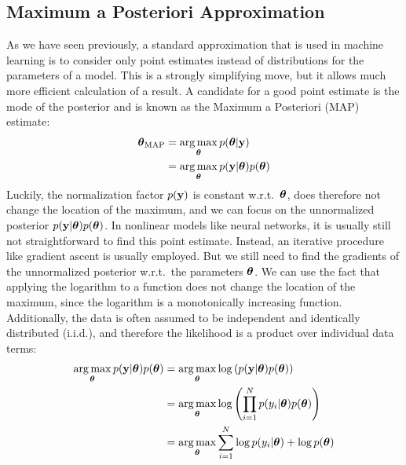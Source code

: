 \documentclass[../thesis.tex]{subfiles}
\begin{document}
\subsection{Maximum a Posteriori Approximation}
As we have seen previously, a standard approximation that is used in machine learning is to consider only point estimates instead of distributions for the parameters of a model. This is a strongly simplifying move, but it allows much more efficient calculation of a result. A candidate for a good point estimate is the mode of the posterior and is known as the Maximum a Posteriori (MAP) estimate:
\begin{equation}
    \begin{split}
        \boldsymbol{\mathbf{\theta}}_{\mathrm{MAP}} &= \operatorname*{arg\,max}_{\boldsymbol{\mathbf{\theta}}} p(\boldsymbol{\mathbf{\theta}} | \boldsymbol{\mathbf{y}}) \\
        &= \operatorname*{arg\,max}_{\boldsymbol{\mathbf{\theta}}} p(\boldsymbol{\mathbf{y}} | \boldsymbol{\mathbf{\theta}}) p(\boldsymbol{\mathbf{\theta}})    
    \end{split}
\end{equation}
Luckily, the normalization factor $p(\boldsymbol{\mathbf{y}})$ is constant w.r.t.\ $\boldsymbol{\mathbf{\theta}}$, does therefore not change the location of the maximum, and we can focus on the unnormalized posterior $p(\boldsymbol{\mathbf{y}} | \boldsymbol{\mathbf{\theta}}) p(\boldsymbol{\mathbf{\theta}})$. 
In nonlinear models like neural networks, it is usually still not straightforward to find this point estimate. Instead, an iterative procedure like gradient ascent is usually employed. But we still need to find the gradients of the unnormalized posterior w.r.t.\ the parameters $\boldsymbol{\mathbf{\theta}}$. We can use the fact that applying the logarithm to a function does not change the location of the maximum, since the logarithm is a monotonically increasing function. Additionally, the data is often assumed to be independent and identically distributed (i.i.d.), and therefore the likelihood is a product over individual data terms:
\begin{equation}
    \begin{split}
        \operatorname*{arg\,max}_{\boldsymbol{\mathbf{\theta}}} p(\boldsymbol{\mathbf{y}} | \boldsymbol{\mathbf{\theta}}) p(\boldsymbol{\mathbf{\theta}}) &= \operatorname*{arg\,max}_{\boldsymbol{\mathbf{\theta}}} \log \left( p(\boldsymbol{\mathbf{y}} | \boldsymbol{\mathbf{\theta}}) p(\boldsymbol{\mathbf{\theta}}) \right) \\
        &= \operatorname*{arg\,max}_{\boldsymbol{\mathbf{\theta}}} \log \left( \prod_{i=1}^N p(y_i | \boldsymbol{\mathbf{\theta}}) p(\boldsymbol{\mathbf{\theta}}) \right) \\
        &= \operatorname*{arg\,max}_{\boldsymbol{\mathbf{\theta}}} \sum_{i=1}^N \log p(y_i | \boldsymbol{\mathbf{\theta}})  +  \log p(\boldsymbol{\mathbf{\theta}})
    \end{split}
\end{equation}
\end{document}
